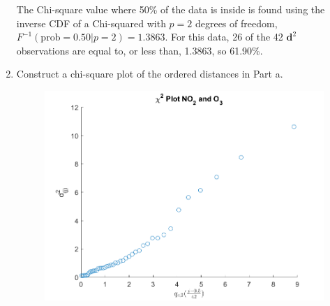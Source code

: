 \begin{enumerate}[label= (\alph*)]
The Chi-square value where 50\% of the data is inside is found using the inverse CDF of a Chi-squared with $p = 2$ degrees of freedom, $F^{-1}(\text{prob} = 0.50| p = 2) = 1.3863$. For this data, 26 of the 42 $\textbf{d}^{2}$ observations are equal to, or less than, 1.3863, so 61.90\%.

    \item Construct a chi-square plot of the ordered distances in Part a.
    
    \begin{figure}[H]
        \includegraphics[scale=0.8]{./matlab/chapter-4/sol4.29c.png}
    \end{figure}
\end{enumerate}
